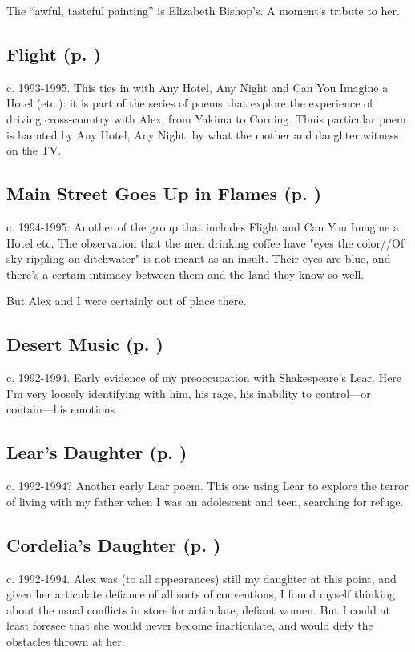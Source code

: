 The ``awful, tasteful painting'' is Elizabeth
Bishop's. A moment's tribute to her.

\subsection*{Flight (p. \pageref{ch:flight})}
c. 1993-1995. This ties in with Any Hotel, Any Night and
Can You Imagine a Hotel (etc.): it is part of the series of poems that
explore the experience of driving cross-country with Alex, from Yakima
to Corning. Thnis particular poem is haunted by Any Hotel, Any Night, by
what the mother and daughter witness on the TV.

\subsection*{Main Street Goes Up in Flames (p. \pageref{ch:main_street})}
c. 1994-1995. Another of the group that includes Flight
and Can You Imagine a Hotel etc. The observation that the men drinking
coffee have "eyes the color//Of sky rippling on ditchwater" is not meant
as an insult. Their eyes are blue, and there's a certain intimacy
between them and the land they know so well.

But Alex and I were certainly out of place there.

\subsection*{Desert Music (p. \pageref{ch:desert_music})}
c. 1992-1994. Early evidence of my preoccupation with
Shakespeare's Lear. Here I'm very loosely identifying with him, his
rage, his inability to control---or contain---his
emotions.

\subsection*{Lear's Daughter  (p. \pageref{ch:lears_daughter})}
c. 1992-1994? Another early Lear poem. This one using
Lear to explore the terror of living with my father when I was an
adolescent and teen, searching for refuge.

\subsection*{Cordelia's Daughter (p. \pageref{ch:cordelias_daughter})}
c. 1992-1994. Alex was (to all appearances) still my
daughter at this point, and given her articulate defiance of all sorts
of conventions, I found myself thinking about the usual conflicts in
store for articulate, defiant women. But I could at least foresee that
she would never become inarticulate, and would defy the obstacles thrown
at her.

